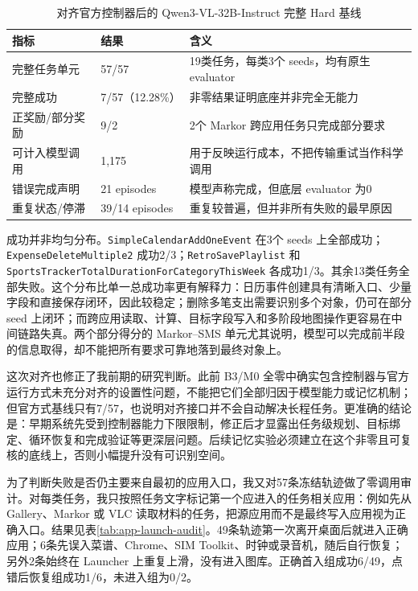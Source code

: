\documentclass[12pt,a4paper]{ctexart}
\newcommand{\code}[1]{\texttt{#1}}
\begin{document}
\begin{table}[H]
    \centering
    \caption{对齐官方控制器后的 Qwen3-VL-32B-Instruct 完整 Hard 基线}
    \label{tab:official-qwen-final}
    \small
    \begin{tabularx}{\textwidth}{p{4.7cm}p{2.2cm}Y}
        \toprule
        指标 & 结果 & 含义 \\
        \midrule
        完整任务单元 & 57/57 & 19类任务，每类3个 seeds，均有原生 evaluator \\
        完整成功 & 7/57（12.28\%） & 非零结果证明底座并非完全无能力 \\
        正奖励/部分奖励 & 9/2 & 2个 Markor 跨应用任务只完成部分要求 \\
        可计入模型调用 & 1,175 & 用于反映运行成本，不把传输重试当作科学调用 \\
        错误完成声明 & 21 episodes & 模型声称完成，但底层 evaluator 为0 \\
        重复状态/停滞 & 39/14 episodes & 重复较普遍，但并非所有失败的最早原因 \\
        \bottomrule
    \end{tabularx}
\end{table}

成功并非均匀分布。\code{SimpleCalendarAddOneEvent} 在3个 seeds 上全部成功；\code{ExpenseDeleteMultiple2} 成功2/3；\code{RetroSavePlaylist} 和 \code{SportsTrackerTotalDurationForCategoryThisWeek} 各成功1/3。其余13类任务全部失败。这个分布比单一总成功率更有解释力：日历事件创建具有清晰入口、少量字段和直接保存闭环，因此较稳定；删除多笔支出需要识别多个对象，仍可在部分 seed 上闭环；而跨应用读取、计算、目标字段写入和多阶段地图操作更容易在中间链路失真。两个部分得分的 Markor--SMS 单元尤其说明，模型可以完成前半段的信息取得，却不能把所有要求可靠地落到最终对象上。

这次对齐也修正了我前期的研究判断。此前 B3/M0 全零中确实包含控制器与官方运行方式未充分对齐的设置性问题，不能把它们全部归因于模型能力或记忆机制；但官方式基线只有7/57，也说明对齐接口并不会自动解决长程任务。更准确的结论是：早期系统先受到控制器能力下限限制，修正后才显露出任务级规划、目标绑定、循环恢复和完成验证等更深层问题。后续记忆实验必须建立在这个非零且可复核的底线上，否则小幅提升没有可识别空间。

为了判断失败是否仍主要来自最初的应用入口，我又对57条冻结轨迹做了零调用审计。对每类任务，我只按照任务文字标记第一个应进入的任务相关应用：例如先从 Gallery、Markor 或 VLC 读取材料的任务，把源应用而不是最终写入应用视为正确入口。结果见表\ref{tab:app-launch-audit}。49条轨迹第一次离开桌面后就进入正确应用；6条先误入菜谱、Chrome、SIM Toolkit、时钟或录音机，随后自行恢复；另外2条始终在 Launcher 上重复上滑，没有进入图库。正确首入组成功6/49，点错后恢复组成功1/6，未进入组为0/2。
\end{document}
